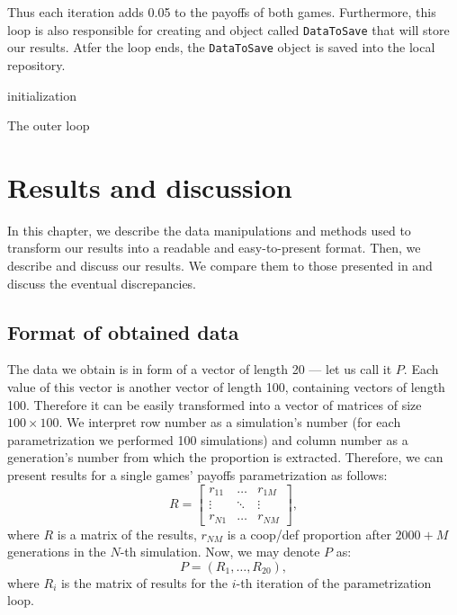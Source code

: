 \documentclass[english, twoside, 12pt, a4paper]{article}
\theoremstyle{definition}
\theoremstyle{plain}
\theoremstyle{remark}
\begin{document}
 Thus each iteration adds 0.05 to the payoffs of both games. Furthermore, this loop is also responsible for creating and object called \lstinline+DataToSave+ that will store our results. Atfer the loop ends, the \lstinline+DataToSave+ object is saved into the local repository.
 
 \begin{algorithm}[H]
  initialization\;
  \caption{The outer loop}
 \end{algorithm}
 
\clearpage
\section{Results and discussion}

In this chapter, we describe the data manipulations and methods used to transform our results into a readable and easy-to-present format. Then, we describe and discuss our results. We compare them to those presented in \cite{santos2005scale} and discuss the eventual discrepancies. 

\subsection{Format of obtained data}

The data we obtain is in form of a vector of length 20 --- let us call it $P$. Each value of this vector is another vector of length 100, containing vectors of length 100. Therefore it can be easily transformed into a vector of matrices of size $100 \times 100$. We interpret row number as a simulation's number (for each parametrization we performed 100 simulations) and column number as a generation's number from which the proportion is extracted. Therefore, we can present results for a single games' payoffs parametrization as follows:
\[
R = \begin{bmatrix} 
    r_{11} & \dots & r_{1M} \\
    \vdots & \ddots & \vdots \\
    r_{N1} &  \dots      & r_{NM} 
    \end{bmatrix}
,\]
where $R$ is a matrix of the results, $r_{NM}$ is a coop/def proportion after $2000 + M$ generations in the $N$-th simulation. Now, we may denote $P$ as:
\[
  P = (R_1, \dots, R_{20}),
\]
where $R_i$ is the matrix of results for the \(i\)-th iteration of the parametrization loop.
\end{document}
